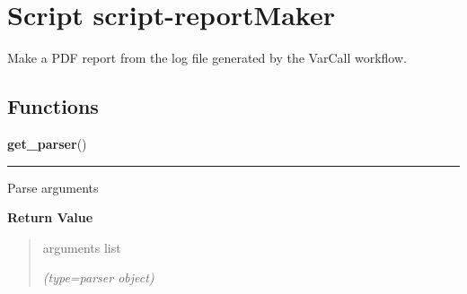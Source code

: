 %
%
%


\section{Script script-reportMaker}

    \label{script-reportMaker}
Make a PDF report from the log file generated by the VarCall workflow.



  \subsection{Functions}

    \label{script-reportMaker:get_parser}

    \vspace{0.5ex}

\hspace{.8\funcindent}\begin{boxedminipage}{\funcwidth}

    \raggedright \textbf{get\_parser}()

    \vspace{-1.5ex}

    \rule{\textwidth}{0.5\fboxrule}
\setlength{\parskip}{2ex}
    Parse arguments

\setlength{\parskip}{1ex}
      \textbf{Return Value}
    \vspace{-1ex}

      \begin{quote}
      arguments list

      {\it (type=parser object)}

      \end{quote}

    \end{boxedminipage}

